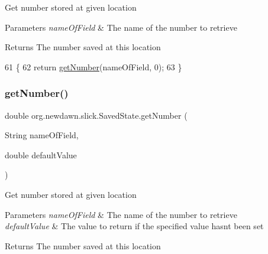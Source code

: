 Get number stored at given location


\begin{DoxyParams}{Parameters}
{\em name\+Of\+Field} & The name of the number to retrieve \\
\hline
\end{DoxyParams}
\begin{DoxyReturn}{Returns}
The number saved at this location 
\end{DoxyReturn}

\begin{DoxyCode}
61                                                 \{
62         \textcolor{keywordflow}{return} \mbox{\hyperlink{classorg_1_1newdawn_1_1slick_1_1_saved_state_a6daea1aaa6e5d6121457332cb5728af2}{getNumber}}(nameOfField, 0);
63     \}
\end{DoxyCode}
\mbox{\label{classorg_1_1newdawn_1_1slick_1_1_saved_state_a02c20e8a5b92fabf133ccebf295cb492}} 
\subsubsection{\texorpdfstring{get\+Number()}{getNumber()}\hspace{0.1cm}{\footnotesize\ttfamily [2/2]}}
{\footnotesize\ttfamily double org.\+newdawn.\+slick.\+Saved\+State.\+get\+Number (\begin{DoxyParamCaption}\item[{String}]{name\+Of\+Field,  }\item[{double}]{default\+Value }\end{DoxyParamCaption})\hspace{0.3cm}{\ttfamily [inline]}}

Get number stored at given location


\begin{DoxyParams}{Parameters}
{\em name\+Of\+Field} & The name of the number to retrieve \\
\hline
{\em default\+Value} & The value to return if the specified value hasn\textquotesingle{}t been set \\
\hline
\end{DoxyParams}
\begin{DoxyReturn}{Returns}
The number saved at this location 
\end{DoxyReturn}

